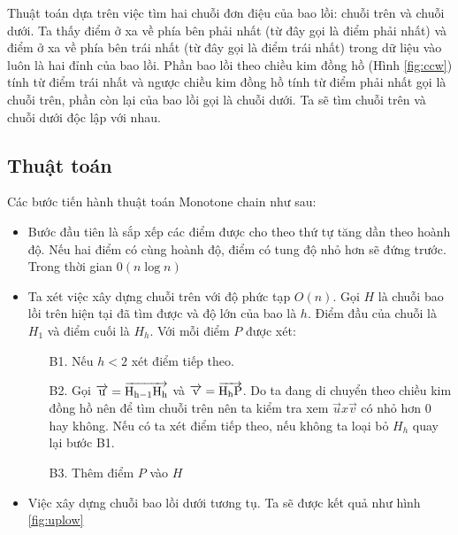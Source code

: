 \documentclass[12pt]{article}
\begin{document}
        Thuật toán dựa trên việc tìm hai chuỗi đơn điệu của bao lồi: chuỗi trên và chuỗi dưới. 
        Ta thấy điểm ở xa về phía bên phải nhất (từ đây gọi là điểm phải nhất) và điểm ở xa về phía bên trái nhất 
        (từ đây gọi là điểm trái nhất) trong dữ liệu vào luôn là hai đỉnh của bao lồi. 
        Phần bao lồi theo chiều kim đồng hồ (Hình \ref{fig:ccw}) tính từ điểm trái nhất và ngược chiều kim đồng hồ tính từ điểm phải nhất gọi là chuỗi trên, 
        phần còn lại của bao lồi gọi là chuỗi dưới.
        Ta sẽ tìm chuỗi trên và chuỗi dưới độc lập với nhau.
      \newpage
      \subsection{Thuật toán}
        Các bước tiến hành thuật toán Monotone chain như sau:
        \begin{itemize}
          \item Bước đầu tiên là sắp xếp các điểm được cho theo thứ tự tăng dần theo hoành độ. Nếu hai điểm có cùng hoành độ, điểm có tung độ nhỏ hơn sẽ đứng trước. Trong thời gian $0(n \log n)$
          \item Ta xét việc xây dựng chuỗi trên với độ phức tạp $O(n)$. 
            Gọi $H$ là chuỗi bao lồi trên hiện tại đã tìm được và độ lớn của bao là $h$. Điểm đầu của chuỗi là $H_1$ và điểm cuối là $H_h$. Với mỗi điểm $P$ được xét:
            \begin{itemize}
              \item[B1.] Nếu $h < 2$ xét điểm tiếp theo.
              \item[B2.] Gọi $\overrightarrow{\rm u} = \overrightarrow{\rm H_{h-1}H_{h}}$ và $\overrightarrow{\rm v} = \overrightarrow{\rm H_hP}$. 
                Do ta đang di chuyển theo chiều kim đồng hồ nên để tìm chuỗi trên nên ta kiểm tra xem $\overrightarrow{u}x\overrightarrow{v}$ có nhỏ hơn 0 hay không.
                Nếu có ta xét điểm tiếp theo, nếu không ta loại bỏ $H_h$ quay lại bước B1.
              \item[B3.] Thêm điểm $P$ vào $H$
            \end{itemize}
          \item Việc xây dựng chuỗi bao lồi dưới tương tụ. Ta sẽ được kết quả như hình \ref{fig:uplow}
        \end{itemize}
      \newpage
\end{document}
